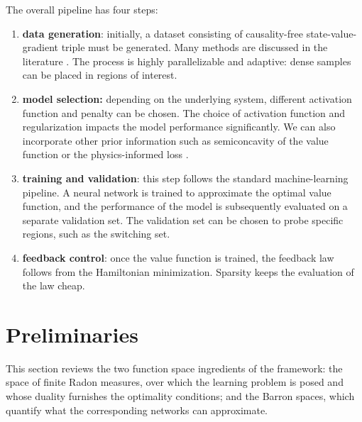 \documentclass[11pt]{amsart}
\theoremstyle{definition}
\theoremstyle{remark}
\begin{document}
The overall pipeline has four steps: 
\begin{enumerate}
	\item \textbf{data generation}: initially, a dataset consisting of causality-free state-value-gradient triple must be generated. 
	Many methods are discussed in the literature \cite{kang2021algorithms, han2024nonsmooth}.
	The process is highly parallelizable and adaptive: dense samples can be placed in regions of interest. 
	\item \textbf{model selection:} depending on the underlying system, different activation function and penalty can be chosen. 
	The choice of activation function and regularization impacts the model performance significantly. 
	We can also incorporate other prior information such as semiconcavity of the value function or the physics-informed loss \cite{doya2000reinforcement, munos1999gradient, raissi2019physics, tassa2007least, liu2014neural}.
	\item \textbf{training and validation}: this step follows the standard machine-learning pipeline. 
	A neural network is trained to approximate the optimal value function, and the performance of the model is subsequently evaluated on a separate validation set. 
	The validation set can be chosen to probe specific regions, such as the switching set. 
	\item \textbf{feedback control}: once the value function is trained, the feedback law follows from the Hamiltonian minimization. Sparsity keeps the evaluation of the law cheap. 
\end{enumerate}

\section{Preliminaries}
This section reviews the two function space ingredients of the framework: the
space of finite Radon measures, over which the learning problem is posed and
whose duality furnishes the optimality conditions;
and the Barron spaces, which quantify what the corresponding networks can approximate.
\end{document}
